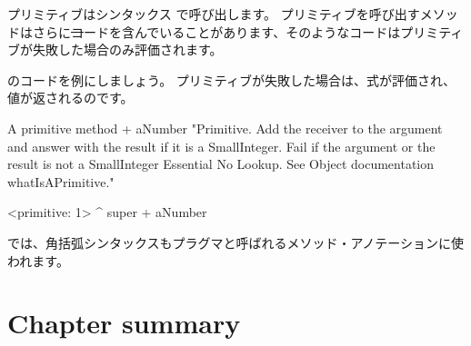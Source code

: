 \documentclass[a4paper,10pt,twoside]{book}
\begin{document}
プリミティブはシンタックス で呼び出します。
プリミティブを呼び出すメソッドはさらに\st コードを含んでいることがあります、そのようなコードはプリミティブが失敗した場合のみ評価されます。

のコードを例にしましょう。
プリミティブが失敗した場合は、式が評価され、値が返されるのです。

\begin{method}[primitive]{A primitive method}
+ aNumber 
  "Primitive. Add the receiver to the argument and answer with the result
  if it is a SmallInteger. Fail if the argument or the result is not a
  SmallInteger  Essential  No Lookup. See Object documentation whatIsAPrimitive."

  <primitive: 1>
  ^ super + aNumber
\end{method}





\pharo では、角括弧シンタックスもプラグマと呼ばれるメソッド・アノテーションに使われます。

\section{Chapter summary}
\end{document}
